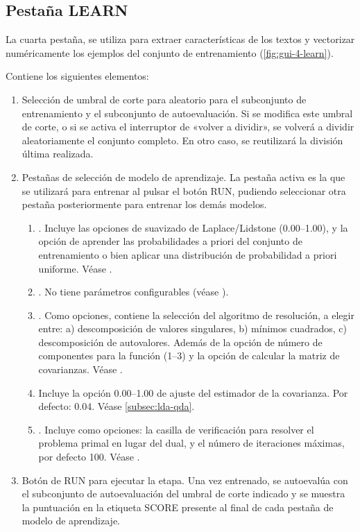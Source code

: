 \FloatBarrier
\newpage
\subsection{Pestaña LEARN}

La cuarta pestaña,  se utiliza para extraer características de los textos y vectorizar numéricamente los ejemplos del conjunto de entrenamiento (\autoref{fig:gui-4-learn}).

Contiene los siguientes elementos:
\begin{enumerate}
\item Selección de umbral de corte para aleatorio para el subconjunto de entrenamiento y el subconjunto de autoevaluación. Si se modifica este umbral de corte, o si se activa el interruptor de «volver a dividir», se volverá a dividir aleatoriamente el conjunto completo. En otro caso, se reutilizará la división última realizada.
\item Pestañas de selección de modelo de aprendizaje. La pestaña activa es la que se utilizará para entrenar al pulsar el botón RUN, pudiendo seleccionar otra pestaña posteriormente para entrenar los demás modelos.
\begin{enumerate}
\item {}. Incluye las opciones de suavizado de Laplace/Lidstone (0.00--1.00), y la opción de aprender las probabilidades a priori del conjunto de entrenamiento o bien aplicar una distribución de probabilidad a priori uniforme. Véase .
\item {}. No tiene parámetros configurables (véase ). 
\item {}. Como opciones, contiene la selección del algoritmo de resolución, a elegir entre: a) descomposición de valores singulares, b) mínimos cuadrados, c) descomposición de autovalores. Además de la opción de número de componentes para la función (1--3) y la opción de calcular la matriz de covarianzas. Véase .
\item {} Incluye la opción 0.00--1.00 de ajuste del estimador de la covarianza. Por defecto: 0.04. Véase \autoref{subsec:lda-qda}.
\item {}. Incluye como opciones: la casilla de verificación para resolver el problema primal en lugar del dual, y el número de iteraciones máximas, por defecto 100. Véase .
\end{enumerate}
\item Botón de RUN para ejecutar la etapa. Una vez entrenado, se autoevalúa con el subconjunto de autoevaluación del umbral de corte indicado y se muestra la puntuación en la etiqueta SCORE presente al final de cada pestaña de modelo de aprendizaje.
\end{enumerate}

